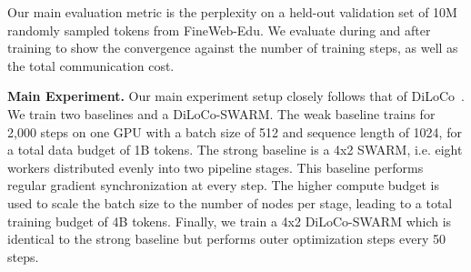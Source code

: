 \documentclass{article}
\begin{document}
Our main evaluation metric is the perplexity on a held-out validation set of 10M
randomly sampled tokens from FineWeb-Edu. We evaluate during and after training
to show the convergence against the number of training steps, as well as the
total communication cost.

\textbf{Main Experiment.} Our main experiment setup closely follows that of
DiLoCo~\cite{douillard2023diloco}. We train two baselines and a DiLoCo-SWARM.
The weak baseline trains for 2,000 steps on one GPU with a batch size of 512 and
sequence length of 1024, for a total data budget of 1B tokens. The strong
baseline is a 4x2 SWARM, i.e. eight workers distributed evenly into two pipeline
stages. This baseline performs regular gradient synchronization at every step.
The higher compute budget is used to scale the batch size to the number of nodes
per stage, leading to a total training budget of 4B tokens. Finally, we train a
4x2 DiLoCo-SWARM which is identical to the strong baseline but performs outer
optimization steps every 50 steps.
\end{document}
